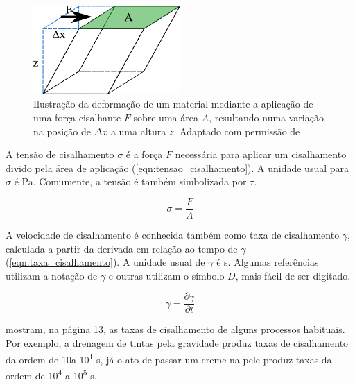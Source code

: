 			\begin{figure}[h]
				\centering
				\includegraphics[width=0.5\textwidth]{imagens/reologia/cisalhamento}
				\caption{Ilustração da deformação de um material mediante a aplicação de uma força cisalhante \(F\) sobre uma área \(A\), resultando numa variação na posição de \(\Delta x\) a uma altura \(z\). Adaptado com permissão de \citeauthor{Barnes_introduction_rheology}
				}
				\label{fig:cisalhamento}
			\end{figure} 
			
			A tensão de cisalhamento \(\sigma\) é a força \(F\) necessária para aplicar um cisalhamento divido pela área de aplicação (\autoref{eqn:tensao_cisalhamento})\cite{Kronberg2014a}. A unidade usual para \(\sigma\) é Pa. Comumente, a tensão é também simbolizada por \(\tau\). 
			
			\begin{equation}
				\sigma = \frac{F}{A}
				\label{eqn:tensao_cisalhamento}
			\end{equation}
			
			A velocidade de cisalhamento é conhecida também como taxa de cisalhamento \(\dot{\gamma}\), calculada a partir da derivada em relação ao tempo de \(\gamma\) (\autoref{eqn:taxa_cisalhamento})\cite{Kronberg2014a}. A unidade usual de \(\dot{\gamma}\) é s\menosUm.  Algumas referências utilizam a notação de \(\dot{\gamma}\) e outras utilizam o símbolo \(D\), mais fácil de ser digitado.\cite{Schramm1994}
			
			\begin{equation}
				\dot{\gamma} = \dfrac{\partial \gamma}{\partial t}
				\label{eqn:taxa_cisalhamento}
			\end{equation}
			
			\citeauthor{Barnes_introduction_rheology} mostram, na página 13, as taxas de cisalhamento de alguns processos habituais. Por exemplo, a drenagem de tintas pela gravidade produz taxas de cisalhamento da ordem de 10\menosUm a 10\textsuperscript{1} s\menosUm, já o ato de passar um creme na pele produz taxas da ordem de 10\textsuperscript{4} a 10\textsuperscript{5} s\menosUm.
						
